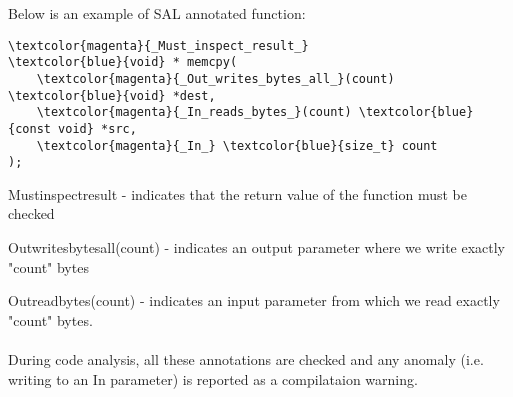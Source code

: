         Below is an example of SAL annotated function:

    \begin{Verbatim}[fontsize=\small, commandchars=\\\{\}]
\textcolor{magenta}{_Must_inspect_result_}
\textcolor{blue}{void} * memcpy(  
    \textcolor{magenta}{_Out_writes_bytes_all_}(count) \textcolor{blue}{void} *dest,   
    \textcolor{magenta}{_In_reads_bytes_}(count) \textcolor{blue}{const void} *src,   
    \textcolor{magenta}{_In_} \textcolor{blue}{size_t} count  
);  
    \end{Verbatim}

    \textunderscore Must\textunderscore inspect\textunderscore result\textunderscore
    - indicates that the return value of the function must be checked

    \textunderscore Out\textunderscore writes\textunderscore bytes\textunderscore all\textunderscore (count)
    - indicates an output parameter where we write exactly "count" bytes

    \textunderscore Out\textunderscore read\textunderscore bytes\textunderscore (count)
    - indicates an input parameter from which we read exactly "count" bytes.

    \paragraph{}
    During code analysis, all these annotations are checked and any anomaly (i.e. writing to an \textunderscore In\textunderscore {} parameter) is
    reported as a compilataion warning.
